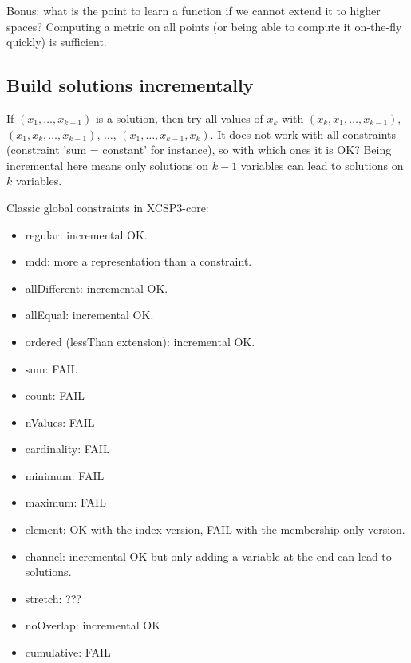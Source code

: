 \documentclass[a4paper, 12pt]{article}
\begin{document}
Bonus: what is the point to learn a function if we cannot extend it to
higher spaces?  Computing a  metric on  all points  (or being  able to
compute it on-the-fly quickly) is sufficient.

\subsection{Build solutions incrementally}
If $(x_1,  \ldots, x_{k-1})$  is a  solution, then  try all  values of
$x_k$       with       $(x_k,      x_1,       \ldots,       x_{k-1})$,
$(x_1,         x_k,        \ldots,         x_{k-1})$,        $\ldots$,
$(x_1, \ldots, x_{k-1},  x_k)$. It does not work  with all constraints
(constraint 'sum =  constant' for instance), so with which  ones it is
OK? Being incremental  here means only solutions  on $k-1$ variables
can lead to solutions on $k$ variables.

Classic global constraints in XCSP3-core:
\begin{itemize}
\item regular: incremental OK.
\item mdd: more a representation than a constraint.
\item allDifferent: incremental OK.
\item allEqual: incremental OK.
\item ordered (lessThan extension): incremental OK.
\item sum: FAIL
\item count: FAIL
\item nValues: FAIL
\item cardinality: FAIL
\item minimum: FAIL
\item maximum: FAIL
\item element: OK with the index version, FAIL with the membership-only version.
\item channel:  incremental OK but only  adding a variable at  the end
  can lead to solutions.
\item stretch: ???
\item noOverlap: incremental OK
\item cumulative: FAIL
\end{itemize}
\end{document}
